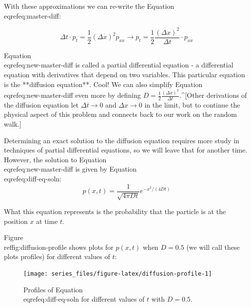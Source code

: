 \documentclass[
]{book}
\theoremstyle{definition}
\theoremstyle{definition}
\theoremstyle{definition}
\theoremstyle{remark}
\begin{document}
With these approximations we can re-write the Equation \\eqref{eq:master-diff}:

\begin{equation}
\Delta t \cdot p_{t} = \frac{1}{2} (\Delta x)^{2} p_{xx} \rightarrow  p_{t} = \frac{1}{2} \frac{(\Delta x)^{2}}{\Delta t} \cdot p_{xx} \label{eq:new-master-diff}
\end{equation}

Equation \\eqref{eq:new-master-diff} is called a partial differential equation - a differential equation with derivatives that depend on two variables.  This particular equation is the **diffusion equation**. Cool!   We can also simplify Equation \\eqref{eq:new-master-diff} even more by defining $\displaystyle D =  \frac{1}{2} \frac{(\Delta x)^{2}}{\Delta t}$.^[Other derivations of the diffusion equation let $\Delta t \rightarrow 0$ and $\Delta x \rightarrow 0$ in the limit, but to continue the physical aspect of this problem and connects back to our work on the random walk.]

Determining an exact solution to the diffusion equation requires more study in techniques of partial differential equations, so we will leave that for another time.  However, the solution to Equation \\eqref{eq:new-master-diff} is given by Equation \\eqref{eq:diff-eq-soln}:
\begin{equation}
 p(x,t) = \frac{1}{\sqrt{4 \pi Dt} } e^{-x^{2}/(4 D t)} \label{eq:diff-eq-soln}
 \end{equation}
 
What this equation represents is the probability that the particle is at the position $x$ at time $t$. 


Figure \\ref{fig:diffusion-profile} shows plots for $p(x,t)$ when $D=0.5$ (we will call these plots profiles) for different values of $t$:


\begin{figure}

{\centering \texttt{[image: series\_files/figure-latex/diffusion-profile-1]} 

}

\caption{Profiles of Equation \\eqref{eq:diff-eq-soln} for different values of $t$ with $D = 0.5$.}\label{fig:diffusion-profile}
\end{figure}
 
\end{document}
